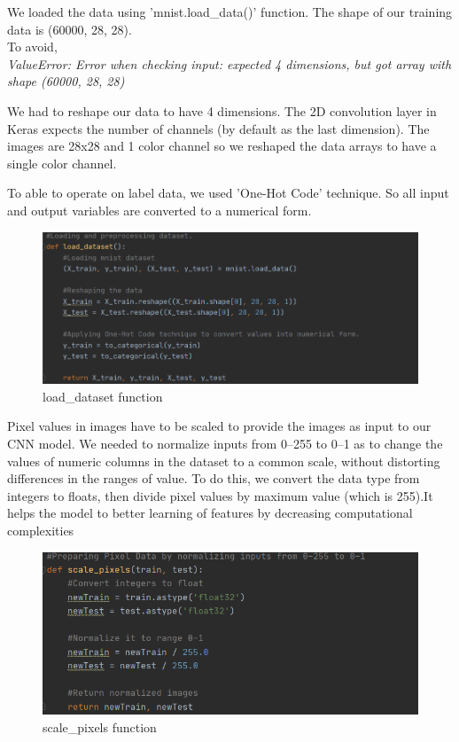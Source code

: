 \documentclass[onecolumn]{article}
\begin{document}
\par We loaded the data using 'mnist.load\_data()' function. The shape of our training data is (60000, 28, 28). \vspace{5mm} %
\\To avoid,\\ 
\emph{ValueError: Error when checking input: expected 4 dimensions, but got array with shape (60000, 28, 28)} \vspace{5mm} %
\par We had to reshape our data to have 4 dimensions. The 2D convolution layer in Keras expects the number of channels (by default as the last dimension). The images are 28x28 and 1 color channel so we reshaped the data arrays to have a single color channel.\vspace{5mm}
\par To able to operate on label data, we used 'One-Hot Code' technique. So all input and output variables are converted to a numerical form.
\begin{figure}[h!]
\centering
    \includegraphics[width=0.6\linewidth]{loading.PNG}
\caption{\label{}
load\_dataset function}
\end{figure}

Pixel values in images have to be scaled to provide the images as input to our CNN model. We needed to normalize inputs from 0–255 to 0–1 as to change the values of numeric columns in the dataset to a common scale, without distorting differences in the ranges of value. To do this, we convert the data type from integers to floats, then divide pixel values by maximum value (which is 255).It helps the model to better learning of features by decreasing computational complexities
\begin{figure}[h!]
\centering
    \includegraphics[width=0.6\linewidth]{scaling.PNG}
\caption{\label{}
scale\_pixels function}
\end{figure}
\end{document}
